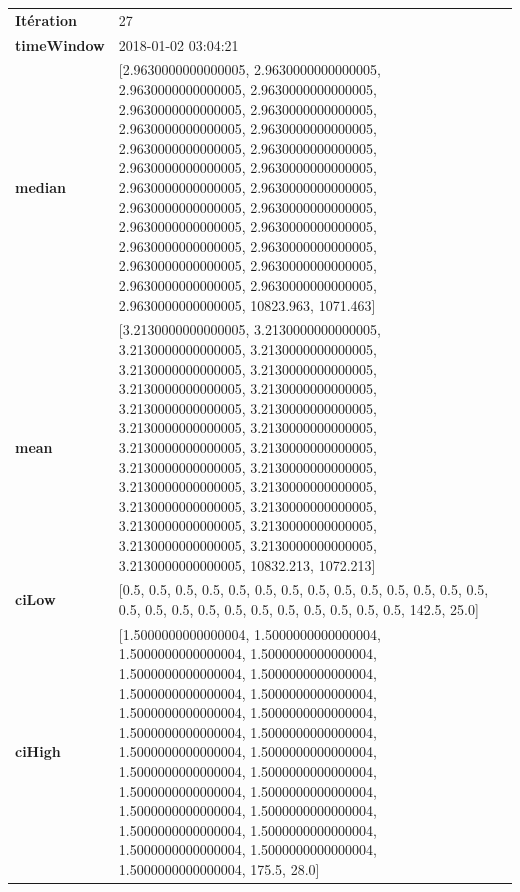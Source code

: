\begin{table}[H]
	\centering
	\begin{tabularx}{\textwidth}{lX}
		\textbf{Itération}& 27 \\
		\textbf{timeWindow}& 2018-01-02 03:04:21 \\
		
		\textbf{median}& [2.9630000000000005, 2.9630000000000005, 2.9630000000000005, 2.9630000000000005, 2.9630000000000005, 2.9630000000000005, 2.9630000000000005, 2.9630000000000005, 2.9630000000000005, 2.9630000000000005, 2.9630000000000005, 2.9630000000000005, 2.9630000000000005, 2.9630000000000005, 2.9630000000000005, 2.9630000000000005, 2.9630000000000005, 2.9630000000000005, 2.9630000000000005, 2.9630000000000005, 2.9630000000000005, 2.9630000000000005, 2.9630000000000005, 2.9630000000000005, 2.9630000000000005, 10823.963, 1071.463] \\
		\textbf{mean} & [3.2130000000000005, 3.2130000000000005, 3.2130000000000005, 3.2130000000000005, 3.2130000000000005, 3.2130000000000005, 3.2130000000000005, 3.2130000000000005, 3.2130000000000005, 3.2130000000000005, 3.2130000000000005, 3.2130000000000005, 3.2130000000000005, 3.2130000000000005, 3.2130000000000005, 3.2130000000000005, 3.2130000000000005, 3.2130000000000005, 3.2130000000000005, 3.2130000000000005, 3.2130000000000005, 3.2130000000000005, 3.2130000000000005, 3.2130000000000005, 3.2130000000000005, 10832.213, 1072.213] \\
		\textbf{ciLow}& [0.5, 0.5, 0.5, 0.5, 0.5, 0.5, 0.5, 0.5, 0.5, 0.5, 0.5, 0.5, 0.5, 0.5, 0.5, 0.5, 0.5, 0.5, 0.5, 0.5, 0.5, 0.5, 0.5, 0.5, 0.5, 142.5, 25.0] \\
		\textbf{ciHigh}& [1.5000000000000004, 1.5000000000000004, 1.5000000000000004, 1.5000000000000004, 1.5000000000000004, 1.5000000000000004, 1.5000000000000004, 1.5000000000000004, 1.5000000000000004, 1.5000000000000004, 1.5000000000000004, 1.5000000000000004, 1.5000000000000004, 1.5000000000000004, 1.5000000000000004, 1.5000000000000004, 1.5000000000000004, 1.5000000000000004, 1.5000000000000004, 1.5000000000000004, 1.5000000000000004, 1.5000000000000004, 1.5000000000000004, 1.5000000000000004, 1.5000000000000004, 175.5, 28.0] \\
							\end{tabularx} 
						\end{table}
						
